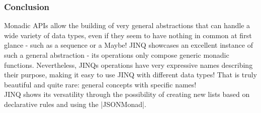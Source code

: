 \subsubsection{Conclusion} %
\label{subsub:JINQ_Conclusion}
Monadic APIs allow the building of very general abstractions that can handle a
wide variety of data types, even if they seem to have nothing in common at
first glance - such as a sequence or a Maybe! JINQ showcases an excellent
instance of such a general abstraction - its operations only compose generic
monadic functions. Nevertheless, JINQs operations have very expressive names
describing their purpose, making it easy to use JINQ with different data types!
That is truly beautiful and quite rare: general concepts with specific
names!\\ 
JINQ shows its versatility through the possibility of creating new lists based
on declarative rules and using the |JSONMonad|.
